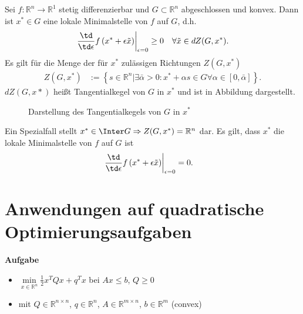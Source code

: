 Sei $f:\mathbb{R}^n\rightarrow\mathbb{R}^1$ stetig differenzierbar und $G\subset\mathbb{R}^n$ abgeschlossen und konvex. Dann ist $x^{\ast}\in G$ eine
lokale Minimalstelle von $f$ auf $G$, d.h.
\begin{align*}
	\left.\frac{\td}{\td \epsilon}f\left(x^{\ast}+\epsilon\tilde{x} \right)\right|_{\epsilon=0}& \geq 0\quad \forall \tilde{x}\in dZ(G,x^{\ast}).\\
\end{align*}
Es gilt für die Menge der für $x^{\ast}$ zulässigen Richtungen $Z(G,x^{\ast})$
\begin{align*}
	Z(G,x^{\ast}) & := \left\{s\in\mathbb{R}^n|\exists\bar{\alpha}>0:x^{\ast}+\alpha s\in G\forall\alpha\in[0,\bar{\alpha}] \right\}.
\end{align*}
$d Z(G,x{\ast})$ heißt Tangentialkegel von $G$ in $x^{\ast}$ und ist in Abbildung  dargestellt.
\begin{figure}[htb]
	\centering
	
	\caption{Darstellung des Tangentialkegels von $G$ in $x^{\ast}$}
	\label{fig:kap_1_tangentialkegel}
\end{figure}
Ein Spezialfall stellt $x^{\ast}\in\Inter G\Rightarrow Z(G,x^{\ast})=\mathbb{R}^n$ dar. Es gilt, dass $x^{\ast}$ die lokale Minimalstelle von $f$
auf $G$ ist
\begin{align*}
	\left.\frac{\td}{\td \epsilon}f\left(x^{\ast}+\epsilon\tilde{x} \right)\right|_{\epsilon=0} & = 0.
\end{align*}

\section{Anwendungen auf quadratische Optimierungsaufgaben}
\textbf{Aufgabe}
\begin{itemize}
	\item[] $\min\limits_{x\in\mathbb{R}^n} \frac12 x^TQx+q^Tx$ bei $Ax\le b$, $Q\ge0$
	\item[] mit $Q\in\mathbb{R}^{n\times n}$, $q\in\mathbb{R}^n$, $A\in\mathbb{R}^{m\times n}$, $b\in\mathbb{R}^m$ (convex) 
\end{itemize}
